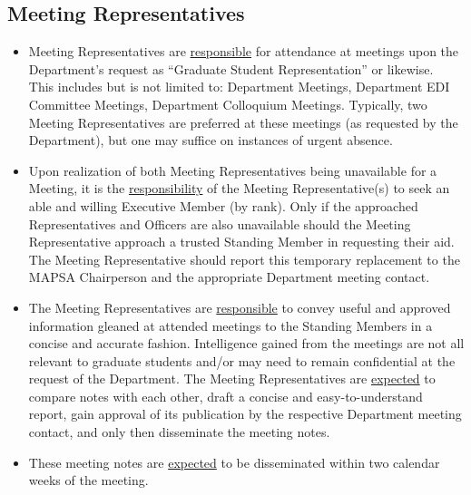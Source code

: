 \documentclass[8pt]{article}
\begin{document}
	\subsection{Meeting Representatives}
	\begin{itemize}
		\item Meeting Representatives are \underline{responsible} for attendance at meetings upon the Department's request as ``Graduate Student Representation'' or likewise.\\
		This includes but is not limited to: Department Meetings, Department EDI Committee Meetings, Department Colloquium Meetings. Typically, two Meeting Representatives are preferred at these meetings (as requested by the Department), but one may suffice on instances of urgent absence. 
		\item Upon realization of both Meeting Representatives being unavailable for a Meeting, it is the \underline{responsibility} of the Meeting Representative(s) to seek an able and willing Executive Member (by rank). Only if the approached Representatives and Officers are also unavailable should the Meeting Representative approach a trusted Standing Member in requesting their aid. The Meeting Representative should report this temporary replacement to the MAPSA Chairperson and the appropriate Department meeting contact.
		\item The Meeting Representatives are \underline{responsible} to convey useful and approved information gleaned at attended meetings to the Standing Members in a concise and accurate fashion. Intelligence gained from the meetings are not all relevant to graduate students and/or may need to remain confidential at the request of the Department. The Meeting Representatives are \underline{expected} to compare notes with each other, draft a concise and easy-to-understand report, gain approval of its publication by the respective Department meeting contact, and only then disseminate the meeting notes.
		\item These meeting notes are \underline{expected} to be disseminated within two calendar weeks of the meeting.
	\end{itemize} 
\end{document}

